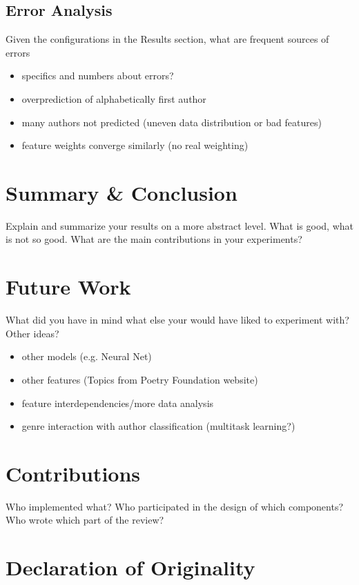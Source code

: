\documentclass[11pt]{article}
\begin{document}
\subsection{Error Analysis}

Given the configurations in the Results section, what are frequent sources of errors
\begin{itemize}
\item specifics and numbers about errors?
\item overprediction of alphabetically first author
\item many authors not predicted (uneven data distribution or bad features)
\item feature weights converge similarly (no real weighting)
\end{itemize}

\section{Summary \& Conclusion}

Explain and summarize your results on a more abstract level. What is good, what is not so
good. What are the main contributions in your experiments?


\section{Future Work}

What did you have in mind what else your
would have liked to experiment with? Other ideas?
\begin{itemize}
\item other models (e.g. Neural Net)
\item other features (Topics from Poetry Foundation website)
\item feature interdependencies/more data analysis
\item genre interaction with author classification (multitask learning?)
\end{itemize}


%
%


\appendix

\section{Contributions}
Who implemented what?
Who participated in the design of which components?
Who wrote which part of the review?
\section{Declaration of Originality}
\label{sec:appendix}
\end{document}
